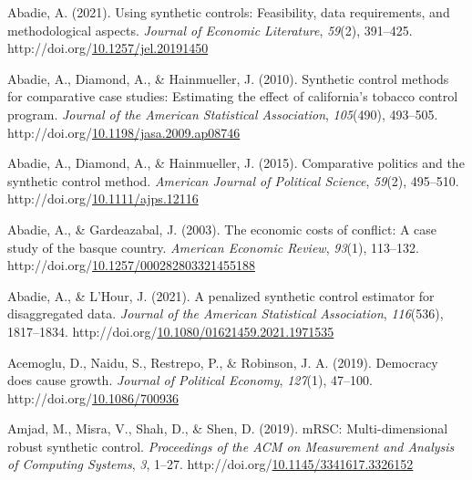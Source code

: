 \documentclass[12pt,nobind, a4paper]{reedthesis}
\newlength{\cslhangindent}
\newenvironment{CSLReferences}[2] %
{%
	\setlength{\parindent}{0pt}
	\ifodd #1 \everypar{\setlength{\hangindent}{\cslhangindent}}\ignorespaces\fi
	\ifnum #2 > 0
	\setlength{\parskip}{#2\baselineskip}
	\fi
}%
{}
\begin{document}
 \hypertarget{refs}{}
 \begin{CSLReferences}{1}{0}
 \leavevmode{}%
 Abadie, A. (2021). Using synthetic controls: Feasibility, data requirements, and methodological aspects. \emph{Journal of Economic Literature}, \emph{59}(2), 391--425. http://doi.org/\href{https://doi.org/10.1257/jel.20191450}{10.1257/jel.20191450}

 \leavevmode{}%
 Abadie, A., Diamond, A., \& Hainmueller, J. (2010). Synthetic control methods for comparative case studies: Estimating the effect of california's tobacco control program. \emph{Journal of the American Statistical Association}, \emph{105}(490), 493--505. http://doi.org/\href{https://doi.org/10.1198/jasa.2009.ap08746}{10.1198/jasa.2009.ap08746}

 \leavevmode{}%
 Abadie, A., Diamond, A., \& Hainmueller, J. (2015). Comparative politics and the synthetic control method. \emph{American Journal of Political Science}, \emph{59}(2), 495--510. http://doi.org/\href{https://doi.org/10.1111/ajps.12116}{10.1111/ajps.12116}

 \leavevmode{}%
 Abadie, A., \& Gardeazabal, J. (2003). The economic costs of conflict: A case study of the basque country. \emph{American Economic Review}, \emph{93}(1), 113--132. http://doi.org/\href{https://doi.org/10.1257/000282803321455188}{10.1257/000282803321455188}

 \leavevmode{}%
 Abadie, A., \& L'Hour, J. (2021). A penalized synthetic control estimator for disaggregated data. \emph{Journal of the American Statistical Association}, \emph{116}(536), 1817--1834. http://doi.org/\href{https://doi.org/10.1080/01621459.2021.1971535}{10.1080/01621459.2021.1971535}

 \leavevmode{}%
 Acemoglu, D., Naidu, S., Restrepo, P., \& Robinson, J. A. (2019). Democracy does cause growth. \emph{Journal of Political Economy}, \emph{127}(1), 47--100. http://doi.org/\href{https://doi.org/10.1086/700936}{10.1086/700936}

 \leavevmode{}%
 Amjad, M., Misra, V., Shah, D., \& Shen, D. (2019). {mRSC}: Multi-dimensional robust synthetic control. \emph{Proceedings of the {ACM} on Measurement and Analysis of Computing Systems}, \emph{3}, 1--27. http://doi.org/\href{https://doi.org/10.1145/3341617.3326152}{10.1145/3341617.3326152}


\end{CSLReferences}
\end{document}
